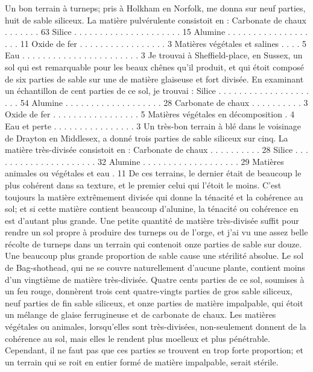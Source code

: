 Un bon terrain à turneps; pris à Holkham en Norfolk, me donna sur neuf parties, huit de sable siliceux. La matière pulvérulente consistoit en :\setcounter{page}{439} Carbonate de chaux . . . . . . . 63
Silice . . . . . . . . . . . . . . . . . . . . . 15
Alumine . . . . . . . . . . . . . . . . . . . 11
Oxide de fer . . . . . . . . . . . . . . . . . 3
Matières végétales et salines . . . . 5
Eau . . . . . . . . . . . . . . . . . . . . . . . 3
Je trouvai à Sheffield-place, en Sussex, un sol qui est remarquable pour les beaux chênes qu'il produit, et qui étoit composé de six parties de sable sur une de matière glaiseuse et fort divisée. En examinant un échantillon de cent parties de ce sol, je trouvai :
Silice . . . . . . . . . . . . . . . . . . . . . 54
Alumine . . . . . . . . . . . . . . . . . . . 28
Carbonate de chaux . . . . . . . . . . 3
Oxide de fer . . . . . . . . . . . . . . . . . 5
Matières végétales en décomposition . 4
Eau et perte . . . . . . . . . . . . . . . . 3
Un très-bon terrain à blé dans le voisinage de Drayton en Middlesex, a donné trois parties de sable siliceux sur cinq. La matière très-divisée consistoit en :
Carbonate de chaux . . . . . . . . . . 28
Silice . . . . . . . . . . . . . . . . . . . . . 32
Alumine . . . . . . . . . . . . . . . . . . . 29
Matières animales ou végétales et eau . 11
De ces terrains, le dernier était de beaucoup\setcounter{page}{440} le plus cohérent dans sa texture, et le premier celui qui l'étoit le moins. C'est toujours la matière extrêmement divisée qui donne la ténacité et la cohérence au sol; et si cette matière contient beaucoup d'alunine, la ténacité ou cohérence en est d'autant plus grande. Une petite quantité de matière très-divisée suffit pour rendre un sol propre à produire des turneps ou de l'orge, et j'ai vu une assez belle récolte de turneps dans un terrain qui contenoit onze parties de sable sur douze. Une beaucoup plus grande proportion de sable cause une stérilité absolue. Le sol de Bag-shothead, qui ne se couvre naturellement d'aucune plante, contient moins d'un vingtième de matière très-divisée. Quatre cents parties de ce sol, soumises à un feu rouge, donnèrent trois cent quatre-vingts parties de gros sable siliceux, neuf parties de fin sable siliceux, et onze parties de matière impalpable, qui étoit un mélange de glaise ferrugineuse et de carbonate de chaux. Les matières végétales ou animales, lorsqu'elles sont très-divisées, non-seulement donnent de la cohérence au sol, mais elles le rendent plus moelleux et plus pénétrable. Cependant, il ne faut pas que ces parties se trouvent en trop forte proportion; et un terrain qui se\setcounter{page}{441} roit en entier formé de matière impalpable, serait stérile.
